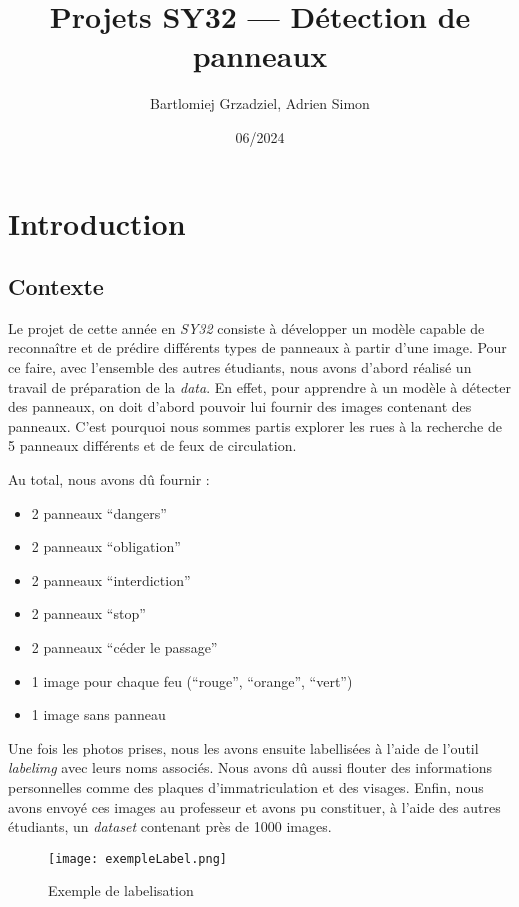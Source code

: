 \documentclass[twocolumn,10pt]{article}
\title{Projets SY32 --- Détection de panneaux}
\author{Bartlomiej Grzadziel, Adrien Simon}
\date{06/2024}
\begin{document}
    \maketitle %
    \thispagestyle{fancy} %

    \section{Introduction}

    \subsection{Contexte}
    Le projet de cette année en \textit{SY32} consiste à développer un modèle capable de reconnaître et de prédire différents types de panneaux à partir d’une image. Pour ce faire, avec l’ensemble des autres étudiants, nous avons d’abord réalisé un travail de préparation de la \textit{data}. En effet, pour apprendre à un modèle à détecter des panneaux, on doit d’abord pouvoir lui fournir des images contenant des panneaux. C’est pourquoi nous sommes partis explorer les rues à la recherche de 5 panneaux différents et de feux de circulation.


    Au total, nous avons dû fournir :
    \begin{itemize}
        \item 2 panneaux “dangers”
        \item 2 panneaux “obligation”
        \item 2 panneaux “interdiction”
        \item 2 panneaux “stop”
        \item 2 panneaux “céder le passage”
        \item 1 image pour chaque feu (“rouge”, “orange”, “vert”)
        \item 1 image sans panneau
    \end{itemize}

    Une fois les photos prises, nous les avons ensuite labellisées à l’aide de l’outil \textit{labelimg} avec leurs noms associés. Nous avons dû aussi flouter des informations personnelles comme des plaques d'immatriculation et des visages. Enfin, nous avons envoyé ces images au professeur et avons pu constituer, à l’aide des autres étudiants, un \textit{dataset} contenant près de 1000 images.


    \begin{figure}[H]
        \centering
        \texttt{[image: exempleLabel.png]}
        \caption{Exemple de labelisation}
        \label{fig:enter-label}
    \end{figure}
\end{document}
